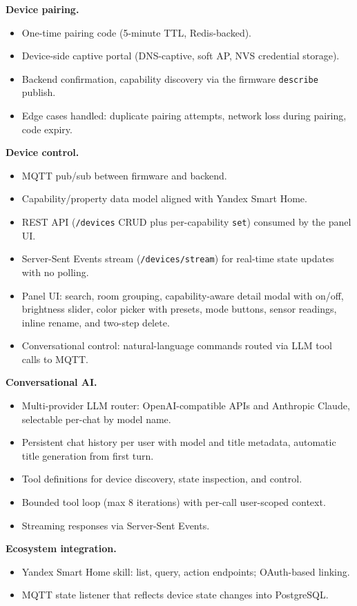 \documentclass[a4paper,12pt]{article}
\begin{document}
\noindent\textbf{Device pairing.}
\begin{itemize}
  \item One-time pairing code (5-minute TTL, Redis-backed).
  \item Device-side captive portal (DNS-captive, soft AP, NVS credential storage).
  \item Backend confirmation, capability discovery via the firmware \verb|describe| publish.
  \item Edge cases handled: duplicate pairing attempts, network loss during pairing, code expiry.
\end{itemize}

\noindent\textbf{Device control.}
\begin{itemize}
  \item MQTT pub/sub between firmware and backend.
  \item Capability/property data model aligned with Yandex Smart Home.
  \item REST API (\verb|/devices| CRUD plus per-capability \verb|set|) consumed by the panel UI.
  \item Server-Sent Events stream (\verb|/devices/stream|) for real-time state updates with no polling.
  \item Panel UI: search, room grouping, capability-aware detail modal with on/off, brightness slider, color picker with presets, mode buttons, sensor readings, inline rename, and two-step delete.
  \item Conversational control: natural-language commands routed via LLM tool calls to MQTT.
\end{itemize}

\noindent\textbf{Conversational AI.}
\begin{itemize}
  \item Multi-provider LLM router: OpenAI-compatible APIs and Anthropic Claude, selectable per-chat by model name.
  \item Persistent chat history per user with model and title metadata, automatic title generation from first turn.
  \item Tool definitions for device discovery, state inspection, and control.
  \item Bounded tool loop (max 8 iterations) with per-call user-scoped context.
  \item Streaming responses via Server-Sent Events.
\end{itemize}

\noindent\textbf{Ecosystem integration.}
\begin{itemize}
  \item Yandex Smart Home skill: list, query, action endpoints; OAuth-based linking.
  \item MQTT state listener that reflects device state changes into PostgreSQL.
\end{itemize}
\end{document}
